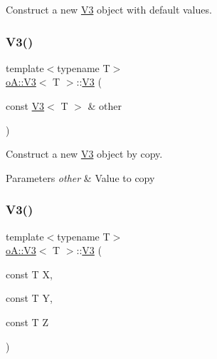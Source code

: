 Construct a new \mbox{\hyperlink{structo_a_1_1_v3}{V3}} object with default values. 

\mbox{\label{structo_a_1_1_v3_a8020feb017daf4289ee5f1b06d3ff952}} 
\subsubsection{\texorpdfstring{V3()}{V3()}\hspace{0.1cm}{\footnotesize\ttfamily [2/3]}}
{\footnotesize\ttfamily template$<$typename T$>$ \\
\mbox{\hyperlink{structo_a_1_1_v3}{o\+A\+::\+V3}}$<$ T $>$\+::\mbox{\hyperlink{structo_a_1_1_v3}{V3}} (\begin{DoxyParamCaption}\item[{const \mbox{\hyperlink{structo_a_1_1_v3}{V3}}$<$ T $>$ \&}]{other }\end{DoxyParamCaption})\hspace{0.3cm}{\ttfamily [inline]}}



Construct a new \mbox{\hyperlink{structo_a_1_1_v3}{V3}} object by copy. 


\begin{DoxyParams}{Parameters}
{\em other} & Value to copy \\
\hline
\end{DoxyParams}
\mbox{\label{structo_a_1_1_v3_a528741444df16de6e4839338ec9d2cf0}} 
\subsubsection{\texorpdfstring{V3()}{V3()}\hspace{0.1cm}{\footnotesize\ttfamily [3/3]}}
{\footnotesize\ttfamily template$<$typename T$>$ \\
\mbox{\hyperlink{structo_a_1_1_v3}{o\+A\+::\+V3}}$<$ T $>$\+::\mbox{\hyperlink{structo_a_1_1_v3}{V3}} (\begin{DoxyParamCaption}\item[{const T}]{X,  }\item[{const T}]{Y,  }\item[{const T}]{Z }\end{DoxyParamCaption})\hspace{0.3cm}{\ttfamily [inline]}}



